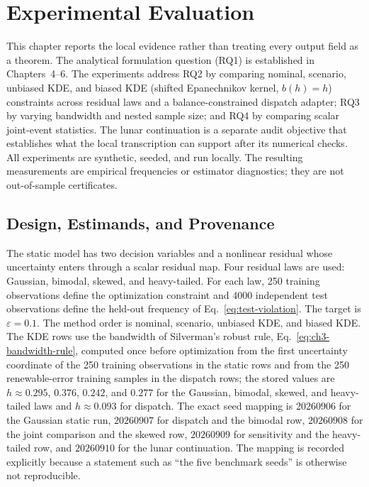 \section{Experimental Evaluation}
\label{ch:experiments}

This chapter reports the local evidence rather than treating every output field as a theorem. The analytical formulation question (RQ1) is established in Chapters~4--6. The experiments address RQ2 by comparing nominal, scenario, unbiased KDE, and biased KDE (shifted Epanechnikov kernel, $b(h)=h$) constraints across residual laws and a balance-constrained dispatch adapter; RQ3 by varying bandwidth and nested sample size; and RQ4 by comparing scalar joint-event statistics. The lunar continuation is a separate audit objective that establishes what the local transcription can support after its numerical checks. All experiments are synthetic, seeded, and run locally. The resulting measurements are empirical frequencies or estimator diagnostics; they are not out-of-sample certificates.

\subsection{Design, Estimands, and Provenance}

The static model has two decision variables and a nonlinear residual whose uncertainty enters through a scalar residual map. Four residual laws are used: Gaussian, bimodal, skewed, and heavy-tailed. For each law, 250 training observations define the optimization constraint and 4000 independent test observations define the held-out frequency of Eq.~\eqref{eq:test-violation}. The target is $\varepsilon=0.1$. The method order is nominal, scenario, unbiased KDE, and biased KDE. The KDE rows use the bandwidth of Silverman's robust rule, Eq.~\eqref{eq:ch3-bandwidth-rule}, computed once before optimization from the first uncertainty coordinate of the 250 training observations in the static rows and from the 250 renewable-error training samples in the dispatch rows; the stored values are $h\approx0.295$, $0.376$, $0.242$, and $0.277$ for the Gaussian, bimodal, skewed, and heavy-tailed laws and $h\approx0.093$ for dispatch. The exact seed mapping is $20260906$ for the Gaussian static run, $20260907$ for dispatch and the bimodal row, $20260908$ for the joint comparison and the skewed row, $20260909$ for sensitivity and the heavy-tailed row, and $20260910$ for the lunar continuation. The mapping is recorded explicitly because a statement such as “the five benchmark seeds” is otherwise not reproducible.

